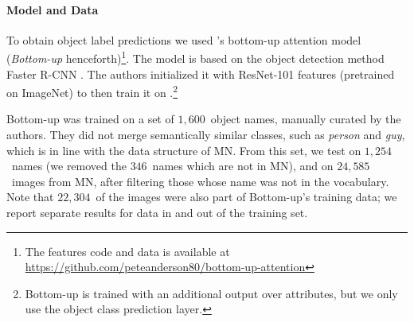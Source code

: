 \paragraph{Model and Data}
To obtain object label predictions we used \citeauthor{anderson2018updown}'s \citeyear{anderson2018updown} bottom-up attention model (\textit{Bottom-up} henceforth)\footnote{The features code and data is available at \url{https://github.com/peteanderson80/bottom-up-attention}}. 
The model is based on the object detection method Faster R-CNN \cite{fasterrcnn2015}. The authors initialized it with ResNet-101 \cite{he2016deep} features (pretrained on ImageNet) to then train it on \vg.\footnote{Bottom-up is trained with an additional output over attributes, but we only use the object class prediction layer.} 
%
\iffalse
"To pretrain the bottom-up attention model, we first initialize Faster R-CNN with ResNet-101 pretrained for classification on ImageNet [35]. We then train on Visual
Genome [21] data. To aid the learning of good feature
representations, we add an additional training output for
predicting attribute classes (in addition to object classes).
To predict attributes for region i, we concatenate the mean
pooled convolutional feature vi with a learned embedding
of the ground-truth object class, and feed this into an additional output layer defining a softmax distribution over each
attribute class plus a ‘no attributes’ class.
The original Faster R-CNN multi-task loss function contains four components, defined over the classification and
bounding box regression outputs for both the RPN and the
final object class proposals respectively. We retain these
components and add an additional multi-class loss component to train the attribute predictor"
\fi

Bottom-up was trained on a set of $1,600$\ object names, manually curated by the authors. %
They did not merge semantically similar classes, such as \textsl{person} and \textsl{guy}, which is in line with the data structure of MN. %
%
From this set, we test on $1,254$~names (we removed the $346$\ names which are not in MN), and on $24,585$~images from MN, after filtering those whose \vg name was not in the vocabulary. 
Note that $22,304$~of the images were also part of Bottom-up's training data; we report separate results for data in and out of the training set. 
%
